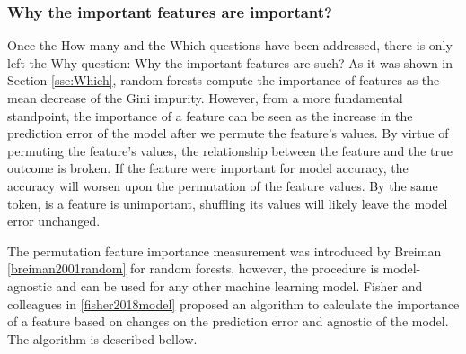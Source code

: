 \documentclass[preprint,12pt]{elsarticle}
\begin{document}
\subsubsection{Why the important features are important?}
\label{sse:Why}
Once the How many and the Which questions have been addressed, there is only left the Why 
question: Why the important features are such?
As it was shown in Section \ref{sse:Which}, random forests compute the importance of features as the mean decrease of the Gini impurity. However, from a more fundamental standpoint, the importance of a feature can be seen as the increase in the prediction error of the model after we permute the feature’s values. By virtue of permuting the feature’s values, the relationship between the feature and the true outcome is broken. 
If the feature were important for model accuracy, the accuracy will worsen upon the permutation of the feature values. By the same token, is a feature is unimportant, shuffling its values will likely leave the model error unchanged.


The permutation feature importance measurement was introduced by Breiman \ref{breiman2001random} for random forests, however, the procedure is model-agnostic and can be used for any other machine learning model. Fisher and colleagues in \ref{fisher2018model} proposed an algorithm to calculate the importance of a feature based on changes on the prediction error and agnostic of the model. The algorithm is described bellow. 
\end{document}

